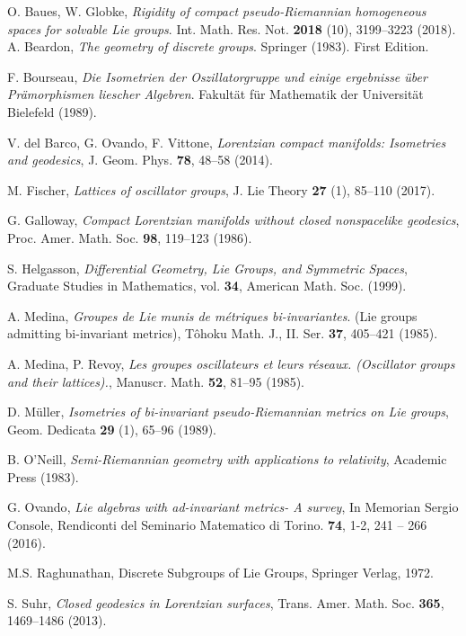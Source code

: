 \documentclass[12pt]{amsart}
\theoremstyle{plain}
\theoremstyle{definition}
\theoremstyle{remark}
\begin{document}
    
	\begin{thebibliography}{GGGG}
		
		 {\sc O. Baues, W. Globke}, {\it Rigidity of compact pseudo-Riemannian homogeneous spaces for solvable Lie groups}. 
			Int. Math. Res. Not. {\bf  2018} (10), 3199--3223 (2018). 
		 {\sc A. Beardon}, {\it The geometry of discrete groups}. Springer (1983). First Edition. 
		
		 {\sc F. Bourseau}, {\it Die Isometrien der Oszillatorgruppe und einige ergebnisse \"uber Pr\"amorphismen liescher Algebren}. Fakult\"at f\"ur Mathematik der Universit\"at Bielefeld (1989).
		
			 {\sc V. del Barco, \sc G. Ovando, \sc F. Vittone}, {\it Lorentzian compact manifolds: Isometries and geodesics}, J. Geom. Phys. {\bf 78}, 48--58 (2014).
		
		
			 {\sc M. Fischer}, {\it Lattices of oscillator groups}, J. Lie Theory {\bf 27} (1), 85--110 (2017). 	
			
			 {\sc G.  Galloway}, {\it  Compact Lorentzian manifolds without closed nonspacelike geodesics}, Proc.
			Amer. Math. Soc. {\bf 98}, 119--123  (1986).
			
			 {\sc S. Helgasson}, {\it Differential Geometry, Lie Groups, and Symmetric Spaces}, Graduate Studies in Mathematics, vol. {\bf 34}, American Math. Soc. (1999).
			
		 {\sc A. Medina}, {\it Groupes de Lie munis de m\'etriques bi-invariantes}. (Lie groups admitting bi-invariant metrics), T\^ohoku Math. J., II. Ser. {\bf 37}, 405--421 (1985). 
		
		
	 {\sc A. Medina,  P. Revoy}, {\it Les groupes oscillateurs et leurs r\'eseaux. (Oscillator groups and their lattices).}, Manuscr. Math. {\bf 52}, 81--95 (1985). 
	
	
	
	
	 {\sc D. M\"uller}, {\it Isometries of bi-invariant pseudo-Riemannian metrics on Lie groups},  Geom. Dedicata {\bf 29} (1),  65--96 (1989).
	
		
		
		 {\sc B. O'Neill}, {\it Semi-Riemannian geometry with
			applications to relativity}, Academic Press (1983).
		
		

		
		 {\sc G. Ovando}, {\it Lie algebras with ad-invariant metrics- A survey}, In Memorian Sergio Console, Rendiconti del Seminario Matematico di Torino. {\bf  74}, 1-2, 241 -- 266 (2016).
		
		 {\sc  M.S. Raghunathan}, Discrete Subgroups of Lie Groups, Springer Verlag, 1972.
		
		 {\sc S. Suhr}, {\it Closed geodesics in Lorentzian surfaces},  	Trans. Amer. Math. Soc. {\bf 365}, 1469--1486 (2013).
		
	\end{thebibliography}
	
	\appendix 
	
	
	
\end{document}
